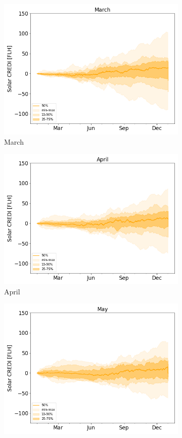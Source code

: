 \documentclass[a4paper,11pt]{extarticle}
\begin{document}
\begin{figure}[t]
\begin{subfigure}[t]{0.32\linewidth}
    \includegraphics[width=\linewidth]{Fig_CUMSUM_YearStart_SPV_March}
    \caption{March }
\end{subfigure}
\begin{subfigure}[t]{0.32\linewidth}
    \includegraphics[width=\linewidth]{Fig_CUMSUM_YearStart_SPV_April}
    \caption{April }
\end{subfigure}
\begin{subfigure}[t]{0.32\linewidth}
    \includegraphics[width=\linewidth]{Fig_CUMSUM_YearStart_SPV_May}

\end{subfigure}
\end{figure}
\end{document}

